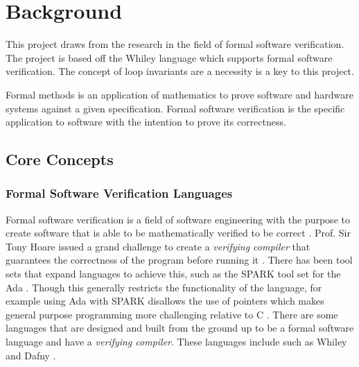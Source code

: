 \chapter{Background}\label{C:background}


This project draws from the research in the field of formal software verification.
The project is based off the Whiley language which supports formal software
verification.
The concept of loop invariants are a necessity is a key to this project.

Formal methods is an application of mathematics to prove software and hardware
systems against a given specification. 
Formal software verification is the specific application to software with
the intention to prove its correctness.



\section{Core Concepts}

\subsection{Formal Software Verification Languages}

Formal software verification is a field of software engineering with the
purpose to create software that is able to be mathematically verified to be
correct \cite{survey-formal-soft}.
Prof. Sir Tony Hoare issued a grand challenge to create a \textit{verifying compiler}
that guarantees the correctness of the program before running it \cite{Hoare-grand}.
There has been tool sets that expand languages to achieve this, such as
the SPARK tool set for the Ada \cite{spark-ada}\cite{spark-high-integ}.
Though this generally restricts the functionality of the language, for example
using Ada with SPARK disallows the use of pointers which makes general purpose
programming more challenging relative to C \cite{spark-ada}.
There are some languages that are designed and built from the ground up to
be a formal software language and have a \textit{verifying compiler}.
These languages include such as Whiley \cite{whiley-origin} and Dafny \cite{dafny-lang}.

